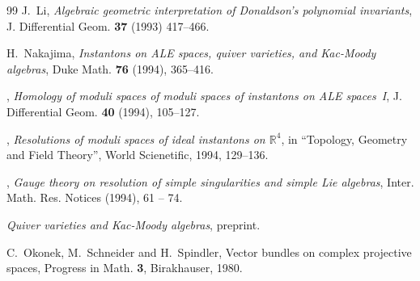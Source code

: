 \documentclass[12pt]{amsart}
\theoremstyle{definition}
\theoremstyle{remark}
\numberwithin{equation}{section}
\begin{document}
\begin{thebibliography}{99}
 J.~Li,
 {\it Algebraic geometric interpretation of Donaldson's polynomial
 invariants},
 J. Differential Geom. {\bf 37} (1993) 417--466.

%
%
%



 H.~Nakajima,
 {\it Instantons on ALE spaces, quiver varieties, and Kac-Moody
   algebras},
 Duke Math. {\bf 76} (1994), 365--416.

 \bysame,
{\it Homology of moduli spaces of moduli spaces of instantons on
ALE spaces~I},
 J. Differential Geom. {\bf 40} (1994), 105--127.

 \bysame,
 {\it Resolutions of moduli spaces of ideal instantons on $\mathbb R^4$},
in ``Topology, Geometry and Field Theory'', World Scienetific, 1994,
129--136.

 \bysame,
{\it Gauge theory on resolution of simple singularities and simple
Lie algebras},
 Inter. Math. Res. Notices (1994), 61 -- 74.


 \bysame
{\it Quiver varieties and Kac-Moody algebras},
preprint.

 C.~Okonek, M.~Schneider and H.~Spindler,
{Vector bundles on complex projective spaces},
Progress in Math. {\bf 3}, Birakhauser, 1980.


\end{thebibliography}
\end{document}
